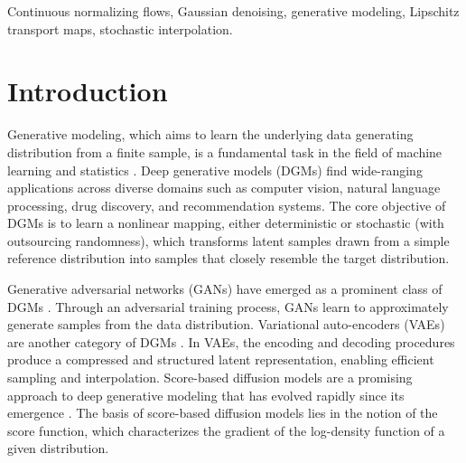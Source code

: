 \documentclass[twoside,11pt]{article}
\numberwithin{equation}{section}
\begin{document}
\begin{keywords}
Continuous normalizing flows,
Gaussian denoising,
generative modeling,
Lipschitz transport maps,
stochastic interpolation.
\end{keywords}

\section{Introduction}

Generative modeling, which aims to learn the underlying data generating distribution from a finite sample, is a fundamental task in the field of machine learning and statistics \citep{salakhutdinov2015learning}.
Deep generative models (DGMs) find wide-ranging applications across diverse domains such as computer vision, natural language processing, drug discovery, and recommendation systems.
The core objective of DGMs is to learn a nonlinear mapping, either deterministic or stochastic (with outsourcing randomness), which transforms latent samples drawn from a simple reference distribution into samples that closely resemble the target distribution.

Generative adversarial networks (GANs) have emerged as a prominent class of DGMs \citep{goodfellow2014generative, arjovsky2017wasserstein, goodfellow2020generative}.
Through an adversarial training process, GANs learn to approximately generate samples from the data distribution. Variational auto-encoders (VAEs) are another category of DGMs \citep{kingma2014auto, rezende2014stochastic, kingma2019introduction}. In VAEs, the encoding and decoding procedures produce a compressed and structured latent representation, enabling efficient sampling and interpolation. Score-based diffusion models are a promising approach to deep generative modeling that has evolved rapidly since its emergence \citep{song2019generative, song2020improved, ho2020denoising, song2021scorebased, song2021denoising}. The basis of score-based diffusion models lies in the notion of the score function, which characterizes the gradient of the log-density function of a given distribution.
\end{document}

